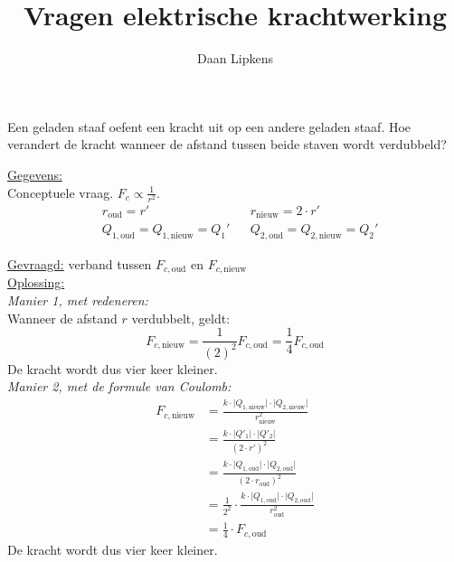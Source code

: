 \documentclass{ximera}
\title{Vragen elektrische krachtwerking}
\author{Daan Lipkens}
\begin{document}
\begin{abstract}
\end{abstract}
\maketitle
\label{vragen:coulombkracht}

\begin{question}
    Een geladen staaf oefent een kracht uit op een andere geladen staaf. Hoe verandert de kracht wanneer de afstand tussen beide staven wordt verdubbeld?

    \begin{solution}\nl
        \underline{Gegevens:}\\
        Conceptuele vraag. $F_{c}\propto \tfrac{1}{r^{2}}$.\\
        
            \begin{align*}
                &r_{\text{oud}}=r' & & r_{\text{nieuw}}=2\cdot r'\\
                &Q_{1,\text{oud}} =Q_{1,\text{nieuw}} = Q_{1}' & & Q_{2,\text{oud}} =Q_{2,\text{nieuw}} = Q_{2}'
            \end{align*}
        
    \underline{Gevraagd:} verband tussen $F_{c,\text{oud}}$ en $F_{c,\text{nieuw}}$ \\

    \underline{Oplossing:}\\
    \emph{Manier 1, met redeneren:}\\
    Wanneer de afstand $r$ verdubbelt, geldt:  
    \[
        F_{c,\text{nieuw}}=\frac{1}{(2)^{2}}F_{c,\text{oud}}=\frac{1}{4}F_{c,\text{oud}}
    \]
    De kracht wordt dus vier keer kleiner.\\

    \emph{Manier 2, met de formule van Coulomb:}
        \begin{align*}
            F_{c,\text{nieuw}}&=\frac{k\cdot\lvert Q_{1,\text{nieuw}}\rvert\cdot\lvert Q_{2,\text{nieuw}}\rvert}{r_{\text{nieuw}}^{2}}\\
            &=\frac{k\cdot\lvert Q'_{1}\rvert\cdot\lvert Q'_{2}\rvert}{(2\cdot r')^{2}}\\
            &=\frac{k\cdot\lvert Q_{1,\text{oud}}\rvert\cdot\lvert Q_{2,\text{oud}}\rvert}{(2\cdot r_{\text{oud}})^{2}}\\
            &=\frac{1}{2^{2}}\cdot\frac{k\cdot\lvert Q_{1,\text{oud}}\rvert\cdot\lvert Q_{2,\text{oud}}\rvert}{r_{\text{oud}}^{2}}\\
            &=\frac{1}{4}\cdot F_{c,\text{oud}}
        \end{align*}
    De kracht wordt dus vier keer kleiner.\\
    \end{solution}

\end{question}
\end{document}
